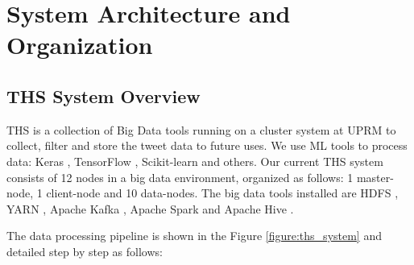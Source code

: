 \documentclass[12pt]{report}
\begin{document}

\chapter{System Architecture and Organization} \label{chapter 4}
\section{THS System Overview} \label{ths_system}

\ac{THS} is a collection of Big Data tools running on a cluster system at \ac{UPRM} to collect, filter and store the tweet data to future uses. We use \ac{ML} tools to process data:  Keras \cite{Keras2019}, TensorFlow \cite{Tensor2019}, Scikit-learn and others. Our current \ac{THS} system consists of 12 nodes in a big data environment, organized as follows: 1 master-node, 1 client-node and 10 data-nodes. The big data tools installed are \ac{HDFS} \cite{Hadoop2019}, \ac{YARN} \cite{Hadoop2019},  Apache Kafka \cite{Kafka2019}, Apache Spark \cite{Spark2019} and Apache Hive \cite{Hive2019}.

The data processing pipeline is shown in the Figure \ref{figure:ths_system} and detailed step by step as follows:
\end{document}

